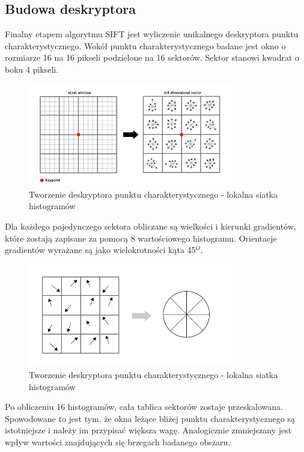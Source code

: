 \subsection{Budowa deskryptora}
Finalny etapem algorytmu SIFT jest wyliczenie  unikalnego deskryptora punktu charakterystycznego. Wokół punktu charakterystycznego badane jest okno o rozmiarze 16 na 16 pikseli podzielone na 16 sektorów. Sektor stanowi kwadrat o boku 4 pikseli. 
\begin{figure}[!htb]
\centering
\includegraphics[width=0.8\textwidth]{pict/02/sift/sift_ais_16_16_128.jpg}
\caption{Tworzenie deskryptora punktu charakterystycznego - lokalna siatka histogramów}
\label{fig:sift_ais_16_16_128}
\end{figure}
Dla każdego pojedynczego sektora obliczane są wielkości i kierunki gradientów, które zostają zapisane za pomocą 8 wartościowego histogramu. Orientacje gradientów wyrażane są jako wielokrotności kąta 45$^O$.




\begin{figure}[!htb]
\centering
\includegraphics[width=0.8\textwidth]{pict/02/sift/sift_ais_4_4_8.jpg}
\caption{Tworzenie deskryptora punktu charakterystycznego - lokalna siatka histogramów}
\label{fig:sift_ais_4_4_8}
\end{figure}

Po obliczeniu 16 histogramów, cała tablica sektorów zostaje przeskalowana. Spowodowane to jest tym, że okna leżące bliżej punktu charakterystycznego są istotniejsze i należy im przypisać większa wagę. Analogicznie zmniejszany jest wpływ wartości znajdujących się brzegach badanego obszaru.

